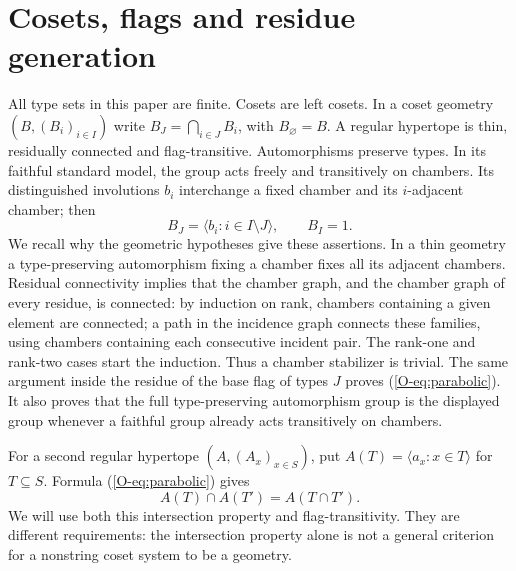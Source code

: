 \section{Cosets, flags and residue generation}\label{O-sec:cosets}
All type sets in this paper are finite. Cosets are left cosets. In a coset geometry $(B,(B_i)_{i\in I})$ write $B_J=\bigcap_{i\in J}B_i$, with $B_\varnothing=B$. A regular hypertope is thin, residually connected and flag-transitive. Automorphisms preserve types. In its faithful standard model, the group acts freely and transitively on chambers. Its distinguished involutions $b_i$ interchange a fixed chamber and its $i$-adjacent chamber; then
\begin{equation}\label{O-eq:parabolic}
B_J=\langle b_i:i\in I\setminus J\rangle,\qquad B_I=1.
\end{equation}
We recall why the geometric hypotheses give these assertions. In a thin geometry a type-preserving automorphism fixing a chamber fixes all its adjacent chambers. Residual connectivity implies that the chamber graph, and the chamber graph of every residue, is connected: by induction on rank, chambers containing a given element are connected; a path in the incidence graph connects these families, using chambers containing each consecutive incident pair. The rank-one and rank-two cases start the induction. Thus a chamber stabilizer is trivial. The same argument inside the residue of the base flag of types $J$ proves (\ref{O-eq:parabolic}). It also proves that the full type-preserving automorphism group is the displayed group whenever a faithful group already acts transitively on chambers.

For a second regular hypertope $(A,(A_x)_{x\in S})$, put $A(T)=\langle a_x:x\in T\rangle$ for $T\subseteq S$. Formula (\ref{O-eq:parabolic}) gives
\begin{equation}\label{O-eq:ip}
A(T)\cap A(T')=A(T\cap T').
\end{equation}
We will use both this intersection property and flag-transitivity. They are different requirements: the intersection property alone is not a general criterion for a nonstring coset system to be a geometry.


